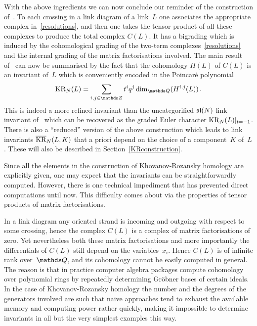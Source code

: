 \documentclass{compositio}
\theoremstyle{definition}
\numberwithin{equation}{section}
\begin{document}
With the above ingredients we can now conclude our reminder of the construction of~\cite{kr0401268}. To each crossing in a link diagram of a link~$L$ one associates the appropriate complex in~\eqref{resolutions}, and then one takes the tensor product of all these complexes to produce the total complex $C(L)$. It has a bigrading which is induced by the cohomological grading of the two-term complexes~\eqref{resolutions} and the internal grading of the matrix factorisations involved. The main result of~\cite{kr0401268} can now be summarised by the fact that the cohomology $H(L)$ of $C(L)$ is an invariant of~$L$ which is conveniently encoded in the Poincar\'e polynomial
$$
\KR_{N}(L) = \sum_{i,j\in\nZ} t^{i} q^j \dim_{\nQ}(H^{i,j}(L)) \, . 
$$
This is indeed a more refined invariant than the uncategorified $\mathfrak{sl}(N)$ link invariant of~\cite{RT1990} which can be recovered as the graded Euler character $\operatorname{KR}_{N}(L)|_{t=-1}$. There is also a ``reduced'' version of the above construction which leads to link invariants $\overline{\operatorname{KR}}_{N}(L,K)$ that a priori depend on the choice of a component~$K$ of~$L$. These will also be described in Section~\ref{KRconstruction}. 

\medskip

Since all the elements in the construction of Khovanov-Rozansky homology are explicitly given, one may expect that the invariants can be straightforwardly computed. However, there is one technical impediment that has prevented direct computations until now. This difficulty comes about via the properties of tensor products of matrix factorisations. 

In a link diagram any oriented strand is incoming and outgoing with respect to some crossing, hence the complex $C(L)$ is a complex of matrix factorisations of zero. Yet nevertheless both these matrix factorisations and more importantly the differentials of $C(L)$ still depend on the variables~$x_{i}$. Hence $C(L)$ is of infinite rank over~$\nQ$, and its cohomology cannot be easily computed in general. The reason is that in practice computer algebra packages compute cohomology over polynomial rings by repeatedly determining Gr\"obner bases of certain ideals. In the case of Khovanov-Rozansky homology the number and the degrees of the generators involved are such that naive approaches tend to exhaust the available memory and computing power rather quickly, making it impossible to determine invariants in all but the very simplest examples this way. 
\end{document}
